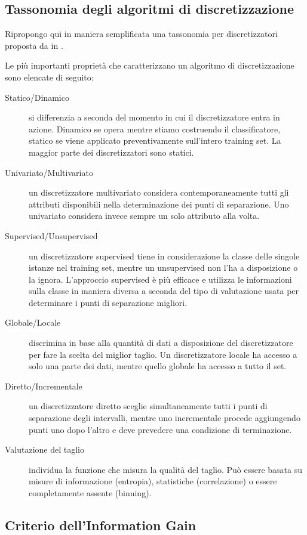 \documentclass[a4paper,11pt,twoside,openright,fleqn]{book}
\begin{document}
\subsection{Tassonomia degli algoritmi di discretizzazione} \label{sec:tassonomia}

Ripropongo qui in maniera semplificata una tassonomia per discretizzatori proposta da \citeauthor{Garcia:2013} in \cite{Garcia:2013}.

Le più importanti proprietà che caratterizzano un algoritmo di discretizzazione sono elencate di seguito:
\begin{description}
\item[Statico/Dinamico] si differenzia a seconda del momento in cui il discretizzatore entra in azione. Dinamico se opera mentre stiamo costruendo il classificatore, statico se viene applicato preventivamente sull'intero training set. La maggior parte dei discretizzatori sono statici.
\item[Univariato/Multivariato] un discretizzatore multivariato considera contemporaneamente tutti gli attributi disponibili nella determinazione dei punti di separazione. Uno univariato considera invece sempre un solo attributo alla volta.
\item[Supervised/Unsupervised] un discretizzatore supervised tiene in considerazione la classe delle singole istanze nel training set, mentre un unsupervised non l'ha a disposizione o la ignora. L'approccio supervised è più efficace e utilizza le informazioni sulla classe in maniera diversa a seconda del tipo di valutazione usata per determinare i punti di separazione migliori.
\item[Globale/Locale] discrimina in base alla quantità di dati a disposizione del discretizzatore per fare la scelta del miglior taglio. Un discretizzatore locale ha accesso a solo una parte dei dati, mentre quello globale ha accesso a tutto il set.
\item[Diretto/Incrementale] un discretizzatore diretto sceglie simultaneamente tutti i punti di separazione degli intervalli, mentre uno incrementale procede aggiungendo punti uno dopo l'altro e deve prevedere una condizione di terminazione.
\item[Valutazione del taglio] individua la funzione che misura la qualità del taglio. Può essere basata su misure di informazione (entropia), statistiche (correlazione) o essere completamente assente (binning).
\end{description}

\subsection{Criterio dell'Information Gain} \label{sec:criterioig}
\end{document}
